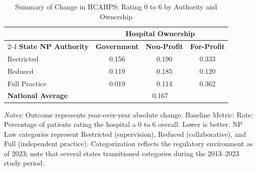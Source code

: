 \begin{table}[htbp]
    \centering
    \caption{Summary of Change in HCAHPS: Rating 0 to 6 by Authority and Ownership}
    \label{tab:d_h_hosp_rating_0_6}
    \vspace{0.2cm}
    \begin{tabular}{lccc}
        \toprule
        & \multicolumn{3}{c}{\textbf{Hospital Ownership}} \\
        \cmidrule(lr){2-4}
        \textbf{State NP Authority} & \textbf{Government} & \textbf{Non-Profit} & \textbf{For-Profit} \\
        \midrule
        Restricted & 0.156 & 0.190 & 0.333 \\
        Reduced & 0.119 & 0.185 & 0.120 \\
        Full Practice & 0.019 & 0.114 & 0.362 \\
        \midrule
        \textbf{National Average} & \multicolumn{3}{c}{0.167} \\
        \bottomrule
    \end{tabular}
    \vspace{0.1cm}
    \begin{minipage}{0.85\textwidth}
        \footnotesize \textit{Notes:} Outcome represents year-over-year absolute change. Baseline Metric: Rate: Percentage of patients rating the hospital a 0 to 6 overall. Lower is better. NP Law categories represent Restricted (supervision), Reduced (collaborative), and Full (independent practice). Categorization reflects the regulatory environment as of 2023; note that several states transitioned categories during the 2013--2023 study period.
    \end{minipage}
\end{table}